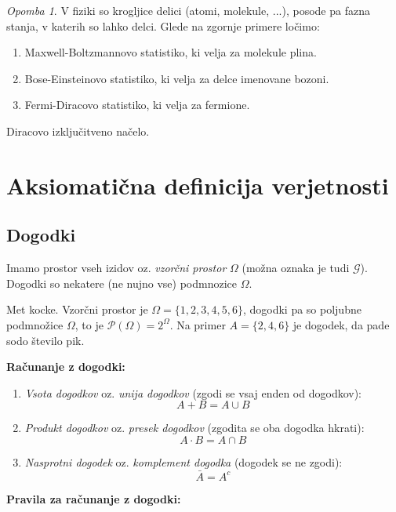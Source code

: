 \documentclass[12pt]{book}
\def\n{\noindent}
\theoremstyle{definition}
\theoremstyle{plain}
\theoremstyle{plain}
\theoremstyle{plain}
\theoremstyle{remark}
\newtheorem*{opomba}{Opomba}
\begin{document}
\begin{opomba}
V fiziki so krogljice delici (atomi, molekule, ...), posode pa fazna stanja, v katerih so lahko delci. Glede na zgornje primere ločimo:
\begin{enumerate}
    \item Maxwell-Boltzmannovo statistiko, ki velja za molekule plina.
    \item Bose-Einsteinovo statistiko, ki velja za delce imenovane bozoni.
    \item Fermi-Diracovo statistiko, ki velja za fermione. 
\end{enumerate}

\n Diracovo izključitveno načelo.

\end{opomba}

\chapter{Aksiomatična definicija verjetnosti}

\section{Dogodki}

Imamo prostor vseh izidov oz. \emph{vzorčni prostor} $\Omega$ (možna oznaka je tudi $\mathcal{G}$). Dogodki so nekatere (ne nujno vse) podmnozice $\Omega$.

\begin{zgled}
    Met kocke. Vzorčni prostor je $\Omega=\{1,2,3,4,5,6\}$, dogodki pa so poljubne podmnožice $\Omega$, to je $\mathcal{P}(\Omega) = 2^{\Omega}$. Na primer $A = \{2,4,6\}$ je dogodek, da pade sodo število pik. 
\end{zgled}

\n \textbf{Računanje z dogodki:}

\begin{enumerate}
    \item \emph{Vsota dogodkov} oz. \emph{unija dogodkov} (zgodi se vsaj enden od dogodkov): $$A + B = A \cup B$$
    \item \emph{Produkt dogodkov} oz. \emph{presek dogodkov} (zgodita se oba dogodka hkrati): $$A \cdot B = A \cap B$$
    \item \emph{Nasprotni dogodek} oz. \emph{komplement dogodka} (dogodek se ne zgodi): $$\bar A = A^c$$
\end{enumerate}

\n \textbf{Pravila za računanje z dogodki:} 
\end{document}
